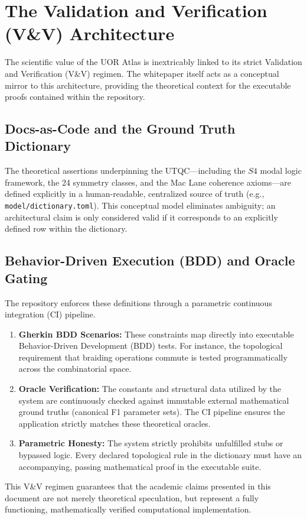 \section{The Validation and Verification (V\&V) Architecture}

The scientific value of the UOR Atlas is inextricably linked to its strict Validation and Verification (V\&V) regimen. The whitepaper itself acts as a conceptual mirror to this architecture, providing the theoretical context for the executable proofs contained within the repository.

\subsection{Docs-as-Code and the Ground Truth Dictionary}
The theoretical assertions underpinning the UTQC---including the $S4$ modal logic framework, the 24 symmetry classes, and the Mac Lane coherence axioms---are defined explicitly in a human-readable, centralized source of truth (e.g., \texttt{model/dictionary.toml}). This conceptual model eliminates ambiguity; an architectural claim is only considered valid if it corresponds to an explicitly defined row within the dictionary.

\subsection{Behavior-Driven Execution (BDD) and Oracle Gating}
The repository enforces these definitions through a parametric continuous integration (CI) pipeline. 
\begin{enumerate}
    \item \textbf{Gherkin BDD Scenarios:} These constraints map directly into executable Behavior-Driven Development (BDD) tests. For instance, the topological requirement that braiding operations commute is tested programmatically across the combinatorial space.
    \item \textbf{Oracle Verification:} The constants and structural data utilized by the system are continuously checked against immutable external mathematical ground truths (canonical F1 parameter sets). The CI pipeline ensures the application strictly matches these theoretical oracles.
    \item \textbf{Parametric Honesty:} The system strictly prohibits unfulfilled stubs or bypassed logic. Every declared topological rule in the dictionary must have an accompanying, passing mathematical proof in the executable suite.
\end{enumerate}

This V\&V regimen guarantees that the academic claims presented in this document are not merely theoretical speculation, but represent a fully functioning, mathematically verified computational implementation.
